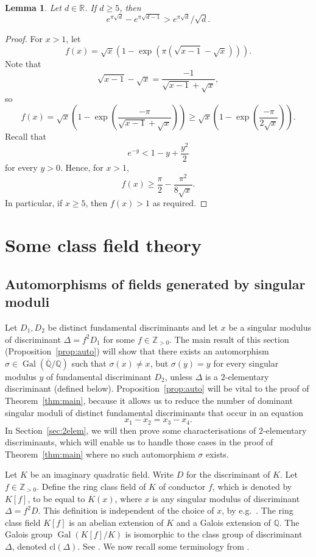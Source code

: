\documentclass[12pt,a4paper,oneside]{amsart}
\newtheorem{lemma}[theorem]{Lemma}
\DeclareMathOperator{\gal}{Gal}
\begin{document}
	
	\begin{lemma}\label{lem:small} Let $d \in \mathbb{R}$. If $d \geq 5$, then
		\[ e^{\pi \sqrt{d}}-e^{\pi \sqrt{d-1}} > e^{\pi \sqrt{d}}/\sqrt{d}. \]	
	\end{lemma}
	\begin{proof}
	For $x>1$, let
		\[ f(x) = \sqrt{x} \left(1 - \exp(\pi (\sqrt{x-1} - \sqrt{x}))\right).\]
		Note that
		\[ \sqrt{x-1} - \sqrt{x} = \frac{-1}{\sqrt{x-1} + \sqrt{x}},\]
		so
		\[ f(x) = \sqrt{x} \left(1 - \exp\left(\frac{-\pi}{\sqrt{x-1} + \sqrt{x}}\right)\right)  \geq \sqrt{x}\left(1 - \exp\left(\frac{-\pi}{2 \sqrt{x}}\right)\right).\]
		Recall that
		\[ e^{-y} < 1 - y +\frac{y^2}{2}\]
		for every $y>0$. Hence, for $x> 1$,
		\[ f(x) \geq \frac{\pi}{2} - \frac{\pi^2}{8 \sqrt{x}}.\]
		In particular, if $x \geq 5$, then $f(x) > 1$ as required.
	\end{proof}
	

	
	\section{Some class field theory}\label{sec:class}

    \subsection{Automorphisms of fields generated by singular moduli}\label{subsec:auto}

Let $D_1, D_2$ be distinct fundamental discriminants and let $x$ be a singular modulus of discriminant $\Delta = f^2 D_1$ for some $f \in \mathbb{Z}_{>0}$. 
The main result of this section (Proposition~\ref{prop:auto}) will show that there exists an automorphism $\sigma \in \gal(\overline{\mathbb{Q}} / \mathbb{Q})$ such that $\sigma(x) \neq x$, but $\sigma(y) = y$ for every singular modulus $y$ of fundamental discriminant $D_2$, unless $\Delta$ is a $2$-elementary discriminant (defined below).
Proposition~\ref{prop:auto} will be vital to the proof of Theorem~\ref{thm:main}, because it allows us to reduce the number of dominant singular moduli of distinct fundamental discriminants that occur in an equation
\[ x_1 - x_2 = x_3 - x_4.\]
In Section~\ref{sec:2elem}, we will then prove some characterisations of $2$-elementary discriminants, which will enable us to handle those cases in the proof of Theorem~\ref{thm:main} where no such automorphism $\sigma$ exists.
	
	
	Let $K$ be an imaginary quadratic field. Write $D$ for the discriminant of $K$. Let $f \in \mathbb{Z}_{>0}$. Define the ring class field of $K$ of conductor $f$, which is denoted by $K[f]$, to be equal to $K(x)$, where $x$ is any singular modulus of discriminant $\Delta = f^2 D$. This definition is independent of the choice of $x$, by e.g.~\cite[Th.~11.1]{Cox89}. 
    The ring class field $K[f]$ is an abelian extension of $K$ and a Galois extension of $\mathbb{Q}$. The Galois group $\gal(K[f]/K)$ is isomorphic to the class group of discriminant $\Delta$, denoted $\mathrm{cl}(\Delta)$. See \cite[p.~180]{Cox89}.
    We now recall some terminology from \cite{BiluGunTron22}.
\end{document}
